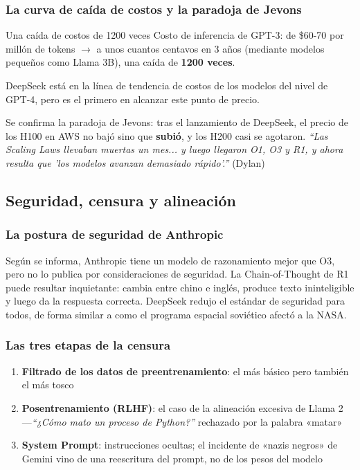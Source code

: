 \documentclass[a4paper]{article}
\begin{document}
\subsubsection{La curva de caída de costos y la paradoja de Jevons}

\begin{importantbox}{Una caída de costos de 1200 veces}
Costo de inferencia de GPT-3: de \$60-70 por millón de tokens $\to$ a unos cuantos centavos en 3 años (mediante modelos pequeños como Llama 3B), una caída de \textbf{1200 veces}.

DeepSeek está en la línea de tendencia de costos de los modelos del nivel de GPT-4, pero es el primero en alcanzar este punto de precio.

Se confirma la paradoja de Jevons: tras el lanzamiento de DeepSeek, el precio de los H100 en AWS no bajó sino que \textbf{subió}, y los H200 casi se agotaron. \textit{``Las Scaling Laws llevaban muertas un mes... y luego llegaron O1, O3 y R1, y ahora resulta que 'los modelos avanzan demasiado rápido'.''} (Dylan)
\end{importantbox}

\subsection{Seguridad, censura y alineación}

\subsubsection{La postura de seguridad de Anthropic}

Según se informa, Anthropic tiene un modelo de razonamiento mejor que O3, pero no lo publica por consideraciones de seguridad. La Chain-of-Thought de R1 puede resultar inquietante: cambia entre chino e inglés, produce texto ininteligible y luego da la respuesta correcta. DeepSeek redujo el estándar de seguridad para todos, de forma similar a como el programa espacial soviético afectó a la NASA.

\subsubsection{Las tres etapas de la censura}

\begin{enumerate}
    \item \textbf{Filtrado de los datos de preentrenamiento}: el más básico pero también el más tosco
    \item \textbf{Posentrenamiento (RLHF)}: el caso de la alineación excesiva de Llama 2 —\textit{``¿Cómo mato un proceso de Python?''} rechazado por la palabra «matar»
    \item \textbf{System Prompt}: instrucciones ocultas; el incidente de «nazis negros» de Gemini vino de una reescritura del prompt, no de los pesos del modelo
\end{enumerate}
\end{document}
